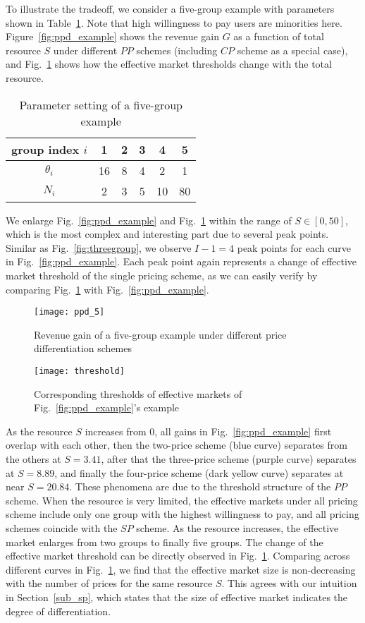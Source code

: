 \documentclass[twocolumn,10pt,twosided]{IEEEtran}
\begin{document}
To illustrate the tradeoff, we consider a five-group example with parameters shown in Table~\ref{tab:ppd}. Note that high willingness to pay users are minorities here. Figure~\ref{fig:ppd_example} shows the revenue gain $G$ as a function of total resource $S$ under different $PP$ schemes (including $CP$ scheme as a special case), and Fig.~\ref{fig:threshold} shows how the effective market thresholds change with the total resource.



\begin{table}[htb]
\centering \caption{Parameter setting of a five-group example}
\label{tab:ppd}
\begin{tabular}{|c|c|c|c|c|c|}
\hline
group  index $i$ &1&2&3&4&5\\
\hline \hline
$\theta_i$&16&8&4&2&1\\
\hline
$N_i$&2&3&5&10&80\\
\hline
\end{tabular}
\end{table}

We enlarge Fig.~\ref{fig:ppd_example} and Fig.~\ref{fig:threshold} within the range of $S\in[0,50]$, which is the most complex and interesting part due to several peak points.
Similar as Fig.~\ref{fig:threegroup}, we observe $I-1=4$ peak points for each curve in Fig.~\ref{fig:ppd_example}. Each peak point again represents a change of effective market threshold of the single pricing scheme, as we can easily verify by comparing Fig.~\ref{fig:threshold} with Fig.~\ref{fig:ppd_example}.


\begin{figure}[htb]
\centering
\texttt{[image: ppd\_5]}
\caption{Revenue gain of a five-group example under different price
differentiation schemes} \label{fig:ppd_example}
\vspace{3mm}
\texttt{[image: threshold]}
\caption{Corresponding thresholds of effective markets of Fig.~\ref{fig:ppd_example}'s example} 
\label{fig:threshold}
\end{figure}


As the resource $S$ increases from $0$, all gains in Fig.~\ref{fig:ppd_example}  first overlap with each other, then the two-price scheme (blue curve) separates from the others at $S=3.41$, after that the three-price scheme (purple curve) separates at $S=8.89$, and finally the four-price scheme (dark yellow curve) separates  at near $S=20.84$.
These phenomena are due to the threshold structure of the $PP$ scheme. When the resource is very limited, the effective markets under all pricing scheme include only one group with the highest willingness to pay, and all pricing schemes coincide with the $SP$ scheme. As the resource increases, the effective market enlarges from two groups to finally five groups. The change of the effective market threshold can be directly observed in Fig.~\ref{fig:threshold}. Comparing across different curves in Fig.~\ref{fig:threshold}, we find that the effective market size is non-decreasing with the number of prices  for the same resource $S$. This agrees with our intuition in Section~\ref{sub_sp}, which states that the size of effective market indicates the degree of differentiation.
\end{document}
